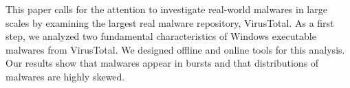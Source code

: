 This paper calls for the attention to investigate real-world malwares in large scales
by examining the largest real malware repository, VirusTotal.
As a first step, we analyzed two fundamental characteristics of Windows executable malwares from VirusTotal. 
We designed offline and online tools for this analysis.
Our results show that malwares appear in bursts and that distributions of malwares are highly skewed. 

